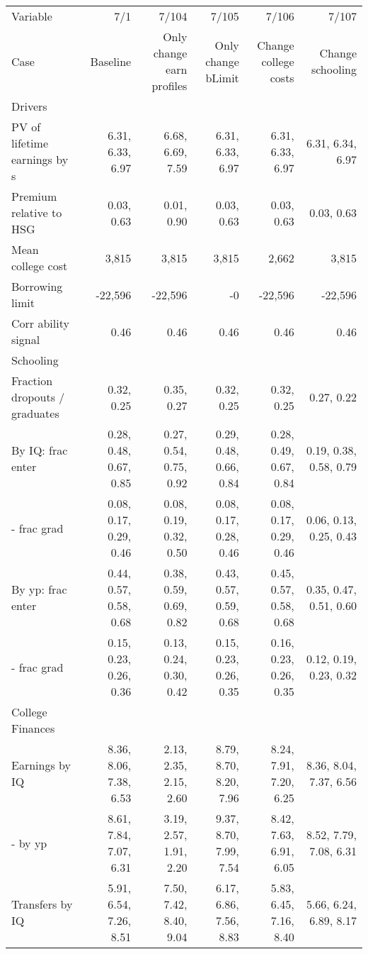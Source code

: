 \begin{tabular}{lrrrrr}
\hline
Variable & 7/1  & 7/104  & 7/105  & 7/106  & 7/107  \\
Case & Baseline  & Only change earn profiles  & Only change bLimit  & Change college costs  & Change schooling  \\
Drivers &   &   &   &   &   \\
PV of lifetime earnings by s & 6.31, 6.33, 6.97  & 6.68, 6.69, 7.59  & 6.31, 6.33, 6.97  & 6.31, 6.33, 6.97  & 6.31, 6.34, 6.97  \\
Premium relative to HSG & 0.03, 0.63  & 0.01, 0.90  & 0.03, 0.63  & 0.03, 0.63  & 0.03, 0.63  \\
Mean college cost & 3,815  & 3,815  & 3,815  & 2,662  & 3,815  \\
Borrowing limit & -22,596  & -22,596  & -0  & -22,596  & -22,596  \\
Corr ability signal & 0.46  & 0.46  & 0.46  & 0.46  & 0.46  \\
\hline
Schooling &   &   &   &   &   \\
Fraction dropouts / graduates & 0.32, 0.25  & 0.35, 0.27  & 0.32, 0.25  & 0.32, 0.25  & 0.27, 0.22  \\
By IQ: frac enter & 0.28, 0.48, 0.67, 0.85  & 0.27, 0.54, 0.75, 0.92  & 0.29, 0.48, 0.66, 0.84  & 0.28, 0.49, 0.67, 0.84  & 0.19, 0.38, 0.58, 0.79  \\
- frac grad & 0.08, 0.17, 0.29, 0.46  & 0.08, 0.19, 0.32, 0.50  & 0.08, 0.17, 0.28, 0.46  & 0.08, 0.17, 0.29, 0.46  & 0.06, 0.13, 0.25, 0.43  \\
By yp: frac enter & 0.44, 0.57, 0.58, 0.68  & 0.38, 0.59, 0.69, 0.82  & 0.43, 0.57, 0.59, 0.68  & 0.45, 0.57, 0.58, 0.68  & 0.35, 0.47, 0.51, 0.60  \\
- frac grad & 0.15, 0.23, 0.26, 0.36  & 0.13, 0.24, 0.30, 0.42  & 0.15, 0.23, 0.26, 0.35  & 0.16, 0.23, 0.26, 0.35  & 0.12, 0.19, 0.23, 0.32  \\
\hline
College Finances &   &   &   &   &   \\
Earnings by IQ & 8.36, 8.06, 7.38, 6.53  & 2.13, 2.35, 2.15, 2.60  & 8.79, 8.70, 8.20, 7.96  & 8.24, 7.91, 7.20, 6.25  & 8.36, 8.04, 7.37, 6.56  \\
- by yp & 8.61, 7.84, 7.07, 6.31  & 3.19, 2.57, 1.91, 2.20  & 9.37, 8.70, 7.99, 7.54  & 8.42, 7.63, 6.91, 6.05  & 8.52, 7.79, 7.08, 6.31  \\
Transfers by IQ & 5.91, 6.54, 7.26, 8.51  & 7.50, 7.42, 8.40, 9.04  & 6.17, 6.86, 7.56, 8.83  & 5.83, 6.45, 7.16, 8.40  & 5.66, 6.24, 6.89, 8.17  \\

\end{tabular}
